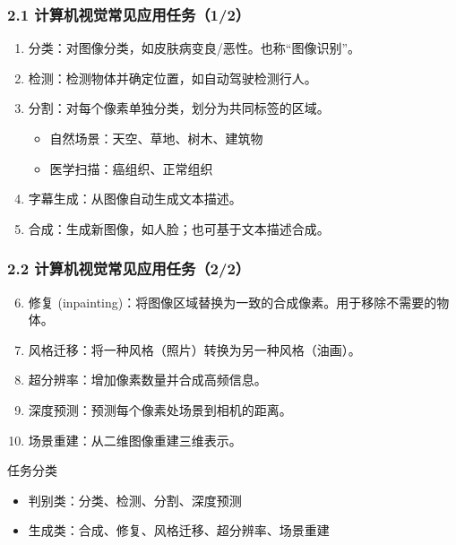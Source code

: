 \documentclass[t,aspectratio=169]{beamer} %
\begin{document}
\begin{frame}
    \frametitle{2.1 计算机视觉常见应用任务（1/2）}
    \begin{enumerate}
        \item \alert{分类}：对图像分类，如皮肤病变良/恶性。也称“图像识别”。
        \item \alert{检测}：检测物体并确定位置，如自动驾驶检测行人。
        \item \alert{分割}：对每个像素单独分类，划分为共同标签的区域。
        \begin{itemize}
            \item 自然场景：天空、草地、树木、建筑物
            \item 医学扫描：癌组织、正常组织
        \end{itemize}
        \item \alert{字幕生成}：从图像自动生成文本描述。
        \item \alert{合成}：生成新图像，如人脸；也可基于文本描述合成。
    \end{enumerate}
\end{frame}

\begin{frame}
    \frametitle{2.2 计算机视觉常见应用任务（2/2）}
    \begin{enumerate}
        \setcounter{enumi}{5}
        \item \alert{修复} (inpainting)：将图像区域替换为一致的合成像素。用于移除不需要的物体。
        \item \alert{风格迁移}：将一种风格（照片）转换为另一种风格（油画）。
        \item \alert{超分辨率}：增加像素数量并合成高频信息。
        \item \alert{深度预测}：预测每个像素处场景到相机的距离。
        \item \alert{场景重建}：从二维图像重建三维表示。
    \end{enumerate}
    \begin{block}{任务分类}
        \begin{itemize}
            \item \alert{判别类}：分类、检测、分割、深度预测
            \item \alert{生成类}：合成、修复、风格迁移、超分辨率、场景重建
        \end{itemize}
    \end{block}
\end{frame}

\end{document}
